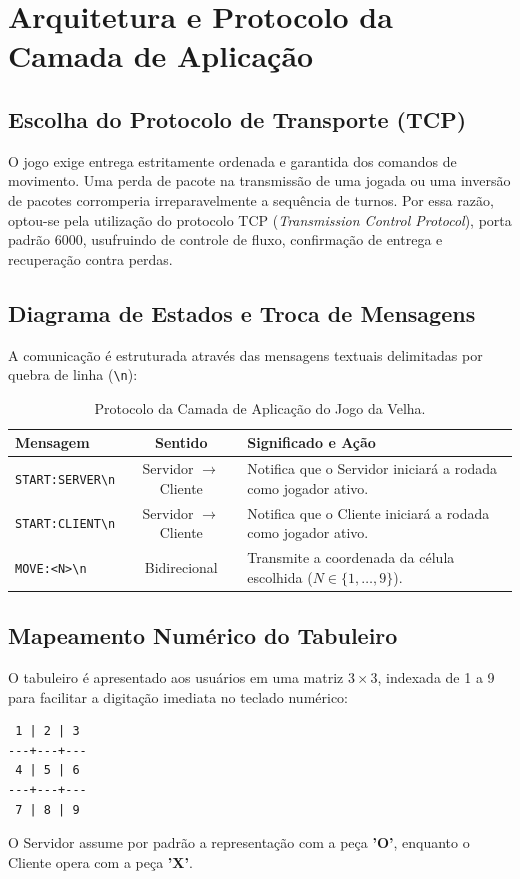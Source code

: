 \documentclass[a4paper,12pt]{article}
\begin{document}
\section{Arquitetura e Protocolo da Camada de Aplicação}

\subsection{Escolha do Protocolo de Transporte (TCP)}
O jogo exige entrega estritamente ordenada e garantida dos comandos de movimento. Uma perda de pacote na transmissão de uma jogada ou uma inversão de pacotes corromperia irreparavelmente a sequência de turnos. Por essa razão, optou-se pela utilização do protocolo TCP (\textit{Transmission Control Protocol}), porta padrão $6000$, usufruindo de controle de fluxo, confirmação de entrega e recuperação contra perdas.

\subsection{Diagrama de Estados e Troca de Mensagens}
A comunicação é estruturada através das mensagens textuais delimitadas por quebra de linha (\texttt{\textbackslash n}):

\begin{table}[H]
\centering
\small
\begin{tabularx}{\textwidth}{lcp{8.5cm}}
\toprule
\textbf{Mensagem} & \textbf{Sentido} & \textbf{Significado e Ação} \\
\midrule
\texttt{START:SERVER\textbackslash n} & Servidor $\to$ Cliente & Notifica que o Servidor iniciará a rodada como jogador ativo. \\
\texttt{START:CLIENT\textbackslash n} & Servidor $\to$ Cliente & Notifica que o Cliente iniciará a rodada como jogador ativo. \\
\texttt{MOVE:<N>\textbackslash n}       & Bidirecional            & Transmite a coordenada da célula escolhida ($N \in \{1, \dots, 9\}$). \\
\bottomrule
\end{tabularx}
\caption{Protocolo da Camada de Aplicação do Jogo da Velha.}
\label{tab:protocolo}
\end{table}

\subsection{Mapeamento Numérico do Tabuleiro}
O tabuleiro é apresentado aos usuários em uma matriz $3 \times 3$, indexada de 1 a 9 para facilitar a digitação imediata no teclado numérico:
\begin{center}
\begin{verbatim}
 1 | 2 | 3 
---+---+---
 4 | 5 | 6 
---+---+---
 7 | 8 | 9 
\end{verbatim}
\end{center}
O Servidor assume por padrão a representação com a peça \textbf{'O'}, enquanto o Cliente opera com a peça \textbf{'X'}.
\end{document}
